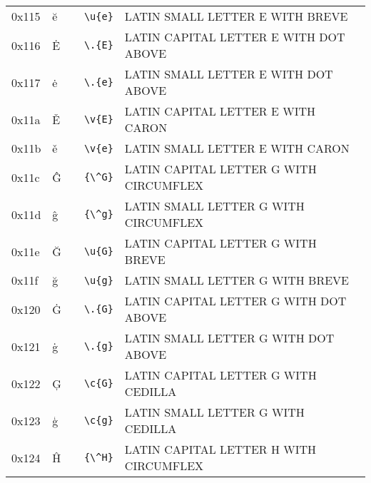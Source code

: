 \documentclass[a4paper,10pt]{article}
\begin{document}
{\begin{center}
\begin{xtabular}{llllp{10cm}}
0x115  & \u{e}                  & \texttt{}           & \texttt{{\textbackslash}u\{e\}}                        & LATIN SMALL LETTER E WITH BREVE            \\
0x116  & \.{E}                  & \texttt{}           & \texttt{{\textbackslash}.\{E\}}                        & LATIN CAPITAL LETTER E WITH DOT ABOVE      \\
0x117  & \.{e}                  & \texttt{}           & \texttt{{\textbackslash}.\{e\}}                        & LATIN SMALL LETTER E WITH DOT ABOVE        \\
0x11a  & \v{E}                  & \texttt{}           & \texttt{{\textbackslash}v\{E\}}                        & LATIN CAPITAL LETTER E WITH CARON          \\
0x11b  & \v{e}                  & \texttt{}           & \texttt{{\textbackslash}v\{e\}}                        & LATIN SMALL LETTER E WITH CARON            \\
0x11c  & {\^G}                  & \texttt{}           & \texttt{\{{\textbackslash}\^{ }G\}}                    & LATIN CAPITAL LETTER G WITH CIRCUMFLEX     \\
0x11d  & {\^g}                  & \texttt{}           & \texttt{\{{\textbackslash}\^{ }g\}}                    & LATIN SMALL LETTER G WITH CIRCUMFLEX       \\
0x11e  & \u{G}                  & \texttt{}           & \texttt{{\textbackslash}u\{G\}}                        & LATIN CAPITAL LETTER G WITH BREVE          \\
0x11f  & \u{g}                  & \texttt{}           & \texttt{{\textbackslash}u\{g\}}                        & LATIN SMALL LETTER G WITH BREVE            \\
0x120  & \.{G}                  & \texttt{}           & \texttt{{\textbackslash}.\{G\}}                        & LATIN CAPITAL LETTER G WITH DOT ABOVE      \\
0x121  & \.{g}                  & \texttt{}           & \texttt{{\textbackslash}.\{g\}}                        & LATIN SMALL LETTER G WITH DOT ABOVE        \\
0x122  & \c{G}                  & \texttt{}           & \texttt{{\textbackslash}c\{G\}}                        & LATIN CAPITAL LETTER G WITH CEDILLA        \\
0x123  & \c{g}                  & \texttt{}           & \texttt{{\textbackslash}c\{g\}}                        & LATIN SMALL LETTER G WITH CEDILLA          \\
0x124  & {\^H}                  & \texttt{}           & \texttt{\{{\textbackslash}\^{ }H\}}                    & LATIN CAPITAL LETTER H WITH CIRCUMFLEX     \\

\end{xtabular}
\end{center}}
\end{document}
